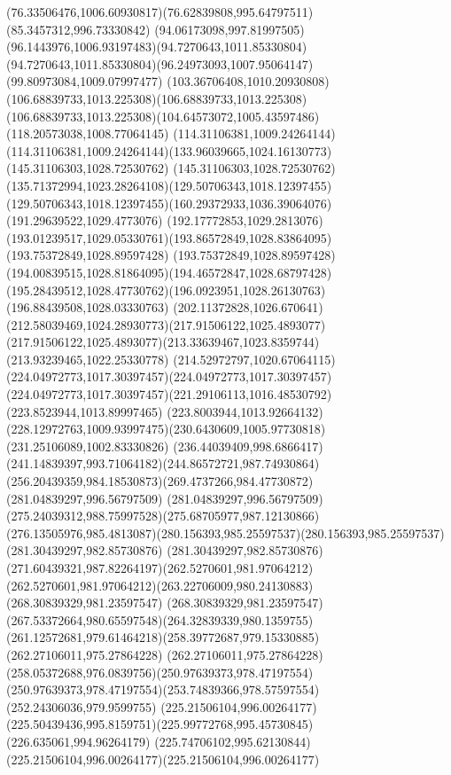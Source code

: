 {{		\curveto(76.33506476,1006.60930817)(76.62839808,995.64797511)(85.3457312,996.73330842)
		\curveto(94.06173098,997.81997505)(96.1443976,1006.93197483)(94.7270643,1011.85330804)
		\curveto(94.7270643,1011.85330804)(96.24973093,1007.95064147)(99.80973084,1009.07997477)
		\curveto(103.36706408,1010.20930808)(106.68839733,1013.225308)(106.68839733,1013.225308)
		\curveto(106.68839733,1013.225308)(104.64573072,1005.43597486)(118.20573038,1008.77064145)
		\lineto(114.31106381,1009.24264144)
		\curveto(114.31106381,1009.24264144)(133.96039665,1024.16130773)(145.31106303,1028.72530762)
		\curveto(145.31106303,1028.72530762)(135.71372994,1023.28264108)(129.50706343,1018.12397455)
		\curveto(129.50706343,1018.12397455)(160.29372933,1036.39064076)(191.29639522,1029.4773076)
		\curveto(192.17772853,1029.2813076)(193.01239517,1029.05330761)(193.86572849,1028.83864095)
		\lineto(193.75372849,1028.89597428)
		\curveto(193.75372849,1028.89597428)(194.00839515,1028.81864095)(194.46572847,1028.68797428)
		\curveto(195.28439512,1028.47730762)(196.0923951,1028.26130763)(196.88439508,1028.03330763)
		\curveto(202.11372828,1026.670641)(212.58039469,1024.28930773)(217.91506122,1025.4893077)
		\curveto(217.91506122,1025.4893077)(213.33639467,1023.8359744)(213.93239465,1022.25330778)
		\curveto(214.52972797,1020.67064115)(224.04972773,1017.30397457)(224.04972773,1017.30397457)
		\curveto(224.04972773,1017.30397457)(221.29106113,1016.48530792)(223.8523944,1013.89997465)
		\lineto(223.8003944,1013.92664132)
		\curveto(228.12972763,1009.93997475)(230.6430609,1005.97730818)(231.25106089,1002.83330826)
		\curveto(236.44039409,998.6866417)(241.14839397,993.71064182)(244.86572721,987.74930864)
		\curveto(256.20439359,984.18530873)(269.4737266,984.47730872)(281.04839297,996.56797509)
		\curveto(281.04839297,996.56797509)(275.24039312,988.75997528)(275.68705977,987.12130866)
		\curveto(276.13505976,985.4813087)(280.156393,985.25597537)(280.156393,985.25597537)
		\lineto(281.30439297,982.85730876)
		\curveto(281.30439297,982.85730876)(271.60439321,987.82264197)(262.5270601,981.97064212)
		\curveto(262.5270601,981.97064212)(263.22706009,980.24130883)(268.30839329,981.23597547)
		\curveto(268.30839329,981.23597547)(267.53372664,980.65597548)(264.32839339,980.1359755)
		\curveto(261.12572681,979.61464218)(258.39772687,979.15330885)(262.27106011,975.27864228)
		\curveto(262.27106011,975.27864228)(258.05372688,976.0839756)(250.97639373,978.47197554)
		\curveto(250.97639373,978.47197554)(253.74839366,978.57597554)(252.24306036,979.9599755)
		\moveto(225.21506104,996.00264177)
		\curveto(225.50439436,995.8159751)(225.99772768,995.45730845)(226.635061,994.96264179)
		\curveto(225.74706102,995.62130844)(225.21506104,996.00264177)(225.21506104,996.00264177)
	}
}
